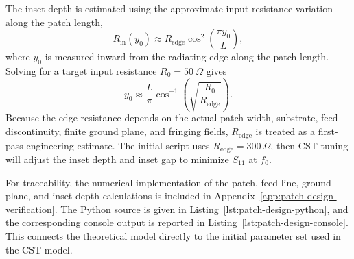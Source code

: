 The inset depth is estimated using the approximate input-resistance variation along the patch length,
\begin{equation}
R_{\mathrm{in}}(y_0)\approx R_{\mathrm{edge}}\cos^2\left(\frac{\pi y_0}{L}\right),
\label{eq:inset-resistance}
\end{equation}
where \(y_0\) is measured inward from the radiating edge along the patch length. Solving for a target
input resistance \(R_0=50~\Omega\) gives
\begin{equation}
y_0\approx \frac{L}{\pi}
\cos^{-1}\left(\sqrt{\frac{R_0}{R_{\mathrm{edge}}}}\right).
\label{eq:inset-depth}
\end{equation}
Because the edge resistance depends on the actual patch width, substrate, feed discontinuity, finite
ground plane, and fringing fields, \(R_{\mathrm{edge}}\) is treated as a first-pass engineering estimate.
The initial script uses \(R_{\mathrm{edge}}=300~\Omega\), then CST tuning will adjust the inset depth
and inset gap to minimize \(S_{11}\) at \(f_0\).

For traceability, the numerical implementation of the patch, feed-line, ground-plane, and inset-depth
calculations is included in Appendix~\ref{app:patch-design-verification}. The Python source is given
in Listing~\ref{lst:patch-design-python}, and the corresponding console output is reported in
Listing~\ref{lst:patch-design-console}. This connects the theoretical model directly to the initial parameter set used in the CST model.
